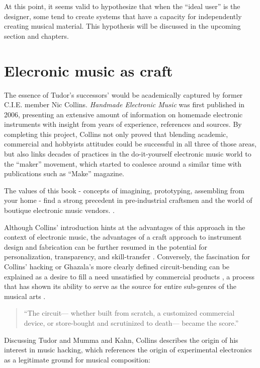 \begin{itemize}
At this point, it seems valid to hypothesize that when the ``ideal user'' is the designer, some tend to create systems that have a capacity for independently creating musical material. This hypothesis will be discussed in the upcoming section and chapters.  

\section{Elecronic music as craft} 

	The essence of Tudor’s successors’ would be academically captured by former C.I.E. member Nic Collins. \emph{Handmade Electronic Music} was first published in 2006, presenting an extensive amount of information on homemade electronic instruments with insight from years of experience, references and sources. By completing this project, Collins not only proved that blending academic, commercial and hobbyists attitudes could be successful in all three of those areas, but also links decades of practices in the do-it-yourself electronic music world to the “maker” movement, which started to coalesce around a similar time with publications such as “Make” magazine.

	The values of this book - concepts of imagining, prototyping, assembling from your home - find a strong precedent in pre-industrial craftsmen and the world of boutique electronic music vendors.   \cite{collins2006,ghazala2005,kuivila2004}. 

Although Collins’ introduction hints at the advantages of this approach in the context of electronic music, the advantages of a craft approach to instrument design and fabrication can be further resumed in the potential for personalization, transparency, and skill-transfer \cite{perner2011}. Conversely, the fascination for Collins’ hacking or Ghazala’s more clearly defined circuit-bending can be explained as a desire to fill a need unsatisfied by commercial products \cite{dunne2005}, a process that has shown its ability to serve as the source for entire sub-genres of the musical arts \cite{dunne2005,kelly2009,novak2013}. 
\begin{quote}
“The circuit— whether built from scratch, a customized commercial device, or store-bought and scrutinized to death— became the score.”
\citep{collins2004}
\end{quote}

	Discussing Tudor and Mumma and Kahn, Collins describes the origin of his interest in music hacking, which references the origin of experimental electronics as a legitimate ground for musical composition: 


\end{itemize}
